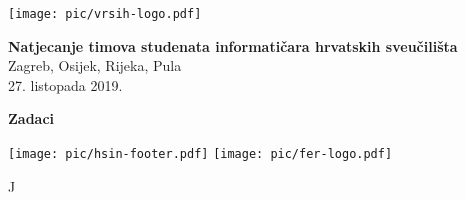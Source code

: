 \documentclass[a4paper]{article}
\begin{document}
\thispagestyle{empty}
\begin{center}
  \texttt{[image: pic/vrsih-logo.pdf]}
\end{center}
\vspace{1cm}
\begin{center}
  {\Large\textbf{\textsf{Natjecanje timova studenata informatičara hrvatskih sveučilišta}}} \\
  \vspace{.5cm}
  {\large{\textsf{Zagreb, Osijek, Rijeka, Pula}}} \\
  \vspace{.3cm}
  \textsf{27. listopada 2019.}
\end{center}
\vspace{2cm}
\begin{center}
  {\large \textbf{Zadaci}}
  
  \begin{minipage}{.5\textwidth}
    \renewcommand\contentsname{}
    \tableofcontents
  \end{minipage}
\end{center}
\vspace{5cm}
\begin{center}
  \texttt{[image: pic/hsin-footer.pdf]}
  \hspace{3cm}
  \texttt{[image: pic/fer-logo.pdf]}
\end{center}
\vspace{\fill}
\clearpage
\setcounter{page}{1}
{J}
\end{document}
